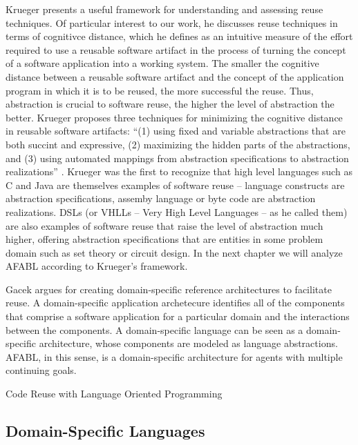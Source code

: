 Krueger presents a useful framework for understanding and assessing reuse techniques. Of particular interest to our work, he discusses reuse techniques in terms of cognitivce distance, which he defines as an intuitive measure of the effort required to use a reusable software artifact in the process of turning the concept of a software application into a working system. The smaller the cognitive distance between a reusable software artifact and the concept of the application program in which it is to be reused, the more successful the reuse. Thus, abstraction is crucial to software reuse, the higher the level of abstraction the better. Krueger proposes three techniques for minimizing the cognitive distance in reusable software artifacts: ``(1) using fixed and variable abstractions that are both succint and expressive, (2) maximizing the hidden parts of the abstractions, and (3) using automated mappings from abstraction specifications to abstraction realizations'' \cite{krueger1992a-software}. Krueger was the first to recognize that high level languages such as C and Java are themselves examples of software reuse -- language constructs are abstraction specifications, assemby language or byte code are abstraction realizations. DSLs (or VHLLs -- Very High Level Languages -- as he called them) are also examples of software reuse that raise the level of abstraction much higher, offering abstraction specifications that are entities in some problem domain such as set theory or circuit design. In the next chapter we will analyze AFABL according to Krueger's framework.

Gacek argues for creating domain-specific reference architectures to facilitate reuse\cite{gacek1995a-exploiting}. A domain-specific application archetecure identifies all of the components that comprise a software application for a particular domain and the interactions between the components. A domain-specific language can be seen as a domain-specific architecture, whose components are modeled as language abstractions. AFABL, in this sense, is a domain-specific architecture for agents with multiple continuing goals.


Code Reuse with Language Oriented Programming \cite{lorenz2011a-code}


\subsection{Domain-Specific Languages}

\cite{deursen2000domain-specific}

